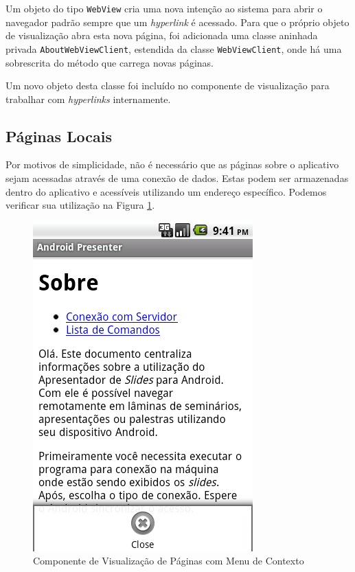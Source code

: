 \documentclass{article}
\begin{document}
Um objeto do tipo \texttt{WebView} cria uma nova intenção ao sistema para abrir
o navegador padrão sempre que um \emph{hyperlink} é acessado. Para que o próprio
objeto de visualização abra esta nova página, foi adicionada uma classe aninhada
privada \texttt{AboutWebViewClient}, estendida da classe
\texttt{WebViewClient}, onde há uma sobrescrita do método que carrega novas
páginas.

Um novo objeto desta classe foi incluído no componente de visualização para
trabalhar com \emph{hyperlinks} internamente.

\subsection{Páginas Locais}

Por motivos de simplicidade, não é necessário que as páginas sobre o aplicativo
sejam acessadas através de uma conexão de dados. Estas podem ser armazenadas
dentro do aplicativo e acessíveis utilizando um endereço específico. Podemos
verificar sua utilização na Figura \ref{fig:about}.

\begin{figure}
    \centering{}
    \includegraphics[scale=0.4]{figura02.png}
    \caption{Componente de Visualização de Páginas com Menu de Contexto}
    \label{fig:about}
\end{figure}
\end{document}
